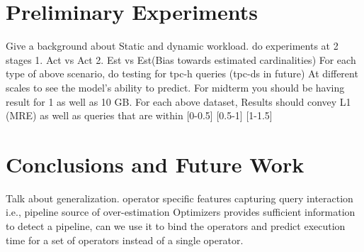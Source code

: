 \documentclass{article}
\begin{document}
\begin{multicols}{2}
	\section{Preliminary Experiments}
	Give a background about Static and dynamic workload.  
	do experiments at 2 stages
	1. Act vs Act
	2. Est vs Est(Bias towards estimated cardinalities)
	For each type of above scenario, do testing for tpc-h queries 
	(tpc-ds in future)
	At different scales to see the model's ability to predict.
	For midterm you should be having result for 1 as well as 10 GB.
	For each above dataset, 
	Results should convey L1 (MRE) as well as queries that are within 
	[0-0.5] [0.5-1] [1-1.5] 
	\section{Conclusions and Future Work}
	Talk about generalization. 
	operator specific features
	capturing query interaction i.e., pipeline source of over-estimation
	Optimizers provides sufficient information to detect a pipeline,
	 can we use it to bind the operators and predict execution time 
	 for a set of operators instead of a single operator.
	
    
    
	
	\end{multicols}
\end{document}
